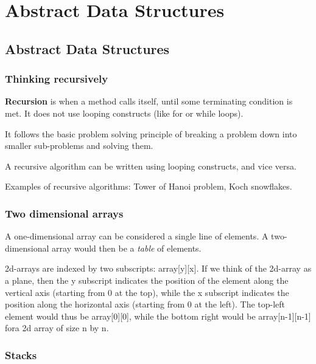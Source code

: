 \documentclass{article}
\begin{document}
\section{Abstract Data Structures}

\subsection{Abstract Data Structures}

\subsubsection{Thinking recursively}

\textbf{Recursion} is when a method calls itself, until some terminating
condition is met. It does not use looping constructs (like for or while loops).

It follows the basic problem solving principle of breaking a problem down into
smaller sub-problems and solving them.

A recursive algorithm can be written using looping constructs, and vice versa.

Examples of recursive algorithms: Tower of Hanoi problem, Koch snowflakes.

\subsubsection{Two dimensional arrays}

A one-dimensional array can be considered a single line of elements. A two-
dimensional array would then be a \textit{table} of elements.

2d-arrays are indexed by two subscripts: array[y][x]. If we think of the
2d-array as a plane, then the y subscript indicates the position of the element
along the vertical axis (starting from 0 at the top), while the x subscript
indicates the position along the horizontal axis (starting from 0 at the left).
The top-left element would thus be array[0][0], while the bottom right would be
array[n-1][n-1] fora 2d array of size n by n.

\subsubsection{Stacks}
\end{document}
